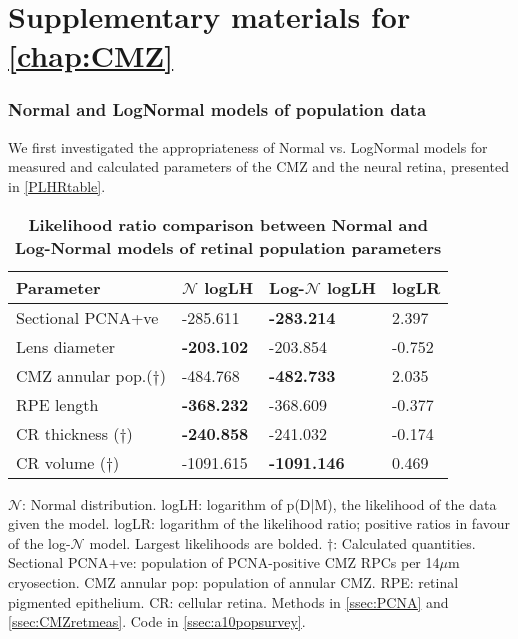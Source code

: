 \chapter{Supplementary materials for \autoref{chap:CMZ}}

\subsection{Normal and LogNormal models of population data}
\label{ssec:NormalModels}

We first investigated the appropriateness of Normal vs. LogNormal models for measured and calculated parameters of the CMZ and the neural retina, presented in \autoref{PLHRtable}.

\begin{table}[!ht]
    \centering
    \caption{
    {\bf Likelihood ratio comparison between Normal and Log-Normal models of retinal population parameters}}
    \begin{tabular}{|l|l|l|l|}
    \hline
    {\bf Parameter} & {\bf $\mathcal{N}$ logLH} & {\bf Log-$\mathcal{N}$ logLH} & {\bf logLR} \\ \hline
    Sectional PCNA+ve & -285.611 & {\bf -283.214} & 2.397\\ \hline
    Lens diameter & {\bf -203.102} & -203.854 & -0.752\\ \hline
    CMZ annular pop.($\dagger$)  & -484.768 & {\bf -482.733} & 2.035\\ \hline
    RPE length & {\bf -368.232} & -368.609 & -0.377\\ \hline
    CR thickness ($\dagger$) & {\bf -240.858} & -241.032 & -0.174\\ \hline
    CR volume ($\dagger$) & -1091.615 & {\bf -1091.146} & 0.469\\ \hline
    \end{tabular}
    \begin{flushleft} $\mathcal{N}$: Normal distribution. logLH: logarithm of p(D|M), the likelihood of the data given the model. logLR: logarithm of the likelihood ratio; positive ratios in favour of the log-$\mathcal{N}$ model. Largest likelihoods are bolded. $\dagger$: Calculated quantities. Sectional PCNA+ve: population of PCNA-positive CMZ RPCs per 14$\mu$m cryosection. CMZ annular pop: population of annular CMZ. RPE: retinal pigmented epithelium. CR: cellular retina.
    Methods in \autoref{ssec:PCNA} and \autoref{ssec:CMZretmeas}.
    Code in \autoref{ssec:a10popsurvey}.
    \end{flushleft}
    \label{PLHRtable}
\end{table}

